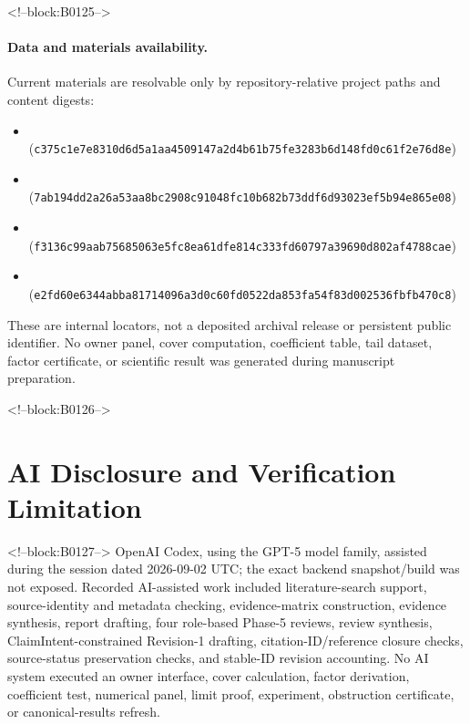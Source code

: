 \documentclass[11pt]{article}
\begin{document}
<!--block:B0125-->
\paragraph{Data and materials availability.} Current materials are
resolvable only by repository-relative project paths and content digests:
\begin{itemize}[leftmargin=*,itemsep=0pt,topsep=2pt]
\item {}\\
(\texttt{c375c1e7\allowbreak{}e8310d6d\allowbreak{}5a1aa450\allowbreak{}9147a2d4\allowbreak{}b61b75fe\allowbreak{}3283b6d1\allowbreak{}48fd0c61\allowbreak{}f2e76d8e})
\item {}\\
(\texttt{7ab194dd\allowbreak{}2a26a53a\allowbreak{}a8bc2908\allowbreak{}c91048fc\allowbreak{}10b682b7\allowbreak{}3ddf6d93\allowbreak{}023ef5b9\allowbreak{}4e865e08})
\item {}\\
(\texttt{f3136c99\allowbreak{}aab75685\allowbreak{}063e5fc8\allowbreak{}ea61dfe8\allowbreak{}14c333fd\allowbreak{}60797a39\allowbreak{}690d802a\allowbreak{}f4788cae})
\item {}\\
(\texttt{e2fd60e6\allowbreak{}344abba8\allowbreak{}1714096a\allowbreak{}3d0c60fd\allowbreak{}0522da85\allowbreak{}3fa54f83\allowbreak{}d002536f\allowbreak{}bfb470c8})
\end{itemize}
These are internal locators, not a deposited archival release or persistent
public identifier. No owner panel, cover computation, coefficient table, tail
dataset, factor certificate, or scientific result was generated during
manuscript preparation.

<!--block:B0126-->
\hypertarget{ai-disclosure-and-verification-limitation}{%
\section*{AI Disclosure and Verification
Limitation}\label{ai-disclosure-and-verification-limitation}}

<!--block:B0127-->
OpenAI Codex, using the GPT-5 model family, assisted during the session
dated 2026-09-02 UTC; the exact backend snapshot/build was not exposed.
Recorded AI-assisted work included literature-search support,
source-identity and metadata checking, evidence-matrix construction,
evidence synthesis, report drafting, four role-based Phase-5 reviews,
review synthesis, ClaimIntent-constrained Revision-1 drafting,
citation-ID/reference closure checks, source-status preservation checks,
and stable-ID revision accounting. No AI system executed an owner
interface, cover calculation, factor derivation, coefficient test,
numerical panel, limit proof, experiment, obstruction certificate, or
canonical-results refresh.
\end{document}
